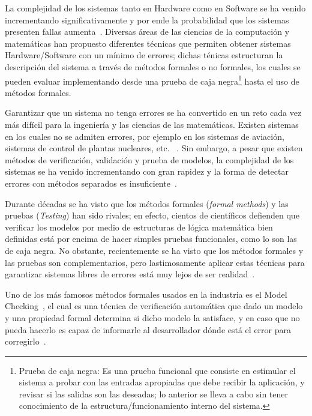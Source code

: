 

\noindent La complejidad de los sistemas tanto en Hardware como en Software se 
ha venido  incrementando significativamente y por ende la probabilidad que los 
sistemas presenten fallas aumenta~\cite{Schneider2004}. Diversas \'areas de 
las ciencias de la computaci\'on y matem\'aticas han propuesto diferentes 
t\'ecnicas que permiten obtener sistemas Hardware/Software con un m\'inimo 
de errores; dichas t\'enicas estructuran la descripci\'on del sistema a 
trav\'es de m\'etodos formales o no formales, los cuales se pueden evaluar 
implementando desde una prueba de caja negra\footnote{Prueba de caja negra: Es 
una prueba funcional que consiste en estimular el sistema a probar con las 
entradas apropiadas que debe recibir la aplicaci\'on, y revisar si las salidas 
son las deseadas; lo anterior se lleva a cabo sin tener conocimiento de la 
estructura/funcionamiento interno del sistema.} hasta el uso de m\'etodos 
formales.

Garantizar que un sistema no tenga errores se ha convertido en un reto cada vez 
m\'as dif\'icil para la ingenier\'ia y las ciencias de las matem\'aticas. 
Existen sistemas en los cuales no se admiten errores, por ejemplo en los 
sistemas de aviaci\'on, sistemas de control de plantas nucleares, etc. 
~\cite{Bowen2000}. Sin embargo, a pesar que existen m\'etodos de 
verificaci\'on, validaci\'on y prueba de modelos, la complejidad de los sistemas 
se ha venido incrementando con gran rapidez y la forma de detectar errores con 
m\'etodos separados es insuficiente~\cite{Bowen2002}. 

Durante d\'ecadas se ha visto que los m\'etodos formales (\textit{formal 
methods}) y las pruebas  (\textit{Testing})  han sido rivales;  en efecto, 
cientos de cient\'ificos defienden que verificar los modelos por medio de 
estructuras de l\'ogica matem\'atica bien definidas est\'a por encima de hacer 
simples pruebas funcionales, como lo son las de caja negra.  No obstante, 
recientemente se ha visto que los m\'etodos formales y las pruebas son 
complementarios, pero lastimosamente aplicar estas t\'ecnicas para 
garantizar sistemas libres de errores est\'a muy lejos de ser realidad~\cite{Bowen2002, Gaudel1996, Hierons2009}. 

Uno de los m\'as famosos m\'etodos formales usados en la industria es el Model 
Checking~\cite{Mikovski2009}, el cual es una t\'ecnica de verificaci\'on 
autom\'atica que dado un modelo y una propiedad formal determina si dicho modelo 
la satisface, y en caso que no pueda hacerlo es capaz de informarle al 
desarrollador d\'onde est\'a el error para corregirlo~\cite{Arias2012, 
Mikovski2009}. 

